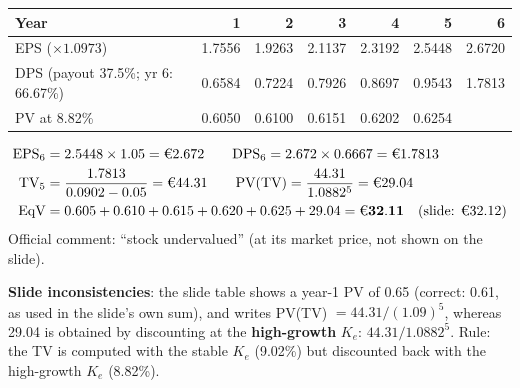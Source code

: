 \begin{exbox}
\begin{center}
\small
\begin{tabular}{@{}lrrrrr|r@{}}
\toprule
Year & 1 & 2 & 3 & 4 & 5 & 6\\
\midrule
EPS ($\times1.0973$) & 1.7556 & 1.9263 & 2.1137 & 2.3192 & 2.5448 & 2.6720\\
DPS (payout 37.5\%; yr 6: 66.67\%) & 0.6584 & 0.7224 & 0.7926 & 0.8697 & 0.9543 & 1.7813\\
PV at 8.82\% & 0.6050 & 0.6100 & 0.6151 & 0.6202 & 0.6254 & \\
\bottomrule
\end{tabular}
\end{center}
\begin{align*}
\text{EPS}_6&=2.5448\times1.05=\text{\euro}2.672\qquad \text{DPS}_6=2.672\times0.6667=\text{\euro}1.7813\\
\text{TV}_5&=\frac{1.7813}{0.0902-0.05}=\text{\euro}44.31\qquad \text{PV(TV)}=\frac{44.31}{1.0882^5}=\text{\euro}29.04\\
\text{EqV}&=0.605+0.610+0.615+0.620+0.625+29.04=\mathbf{\text{\euro}32.11}\quad\text{(slide: \euro32.12)}
\end{align*}
Official comment: ``stock undervalued'' (at its market price, not shown on the slide).

\textcolor{keyred}{\textbf{Slide inconsistencies}}: the slide table shows a year-1 PV of 0.65 (correct: 0.61, as used in the slide's own sum), and writes PV(TV) $=44.31/(1.09)^5$, whereas 29.04 is obtained by discounting at the \textbf{high-growth} $K_e$: $44.31/1.0882^5$. Rule: the TV is computed with the stable $K_e$ (9.02\%) but discounted back with the high-growth $K_e$ (8.82\%).
\end{exbox}

